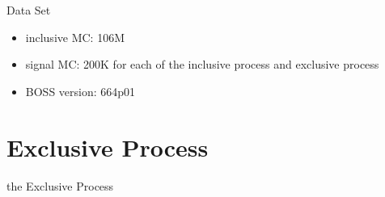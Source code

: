 \documentclass{beamer}
\begin{document}
\begin{frame}{Data Set}
\begin{itemize}
\item inclusive MC:     106M
\item signal MC:        200K for each of the inclusive process and exclusive process
\item BOSS version:     664p01
\end{itemize}
\end{frame}

\section{Exclusive Process}
\begin{frame}
\begin{block}{}
\begin{center}
\bigskip
\huge{the Exclusive Process}
\bigskip
\end{center}
\end{block}
\end{frame}
\end{document}

